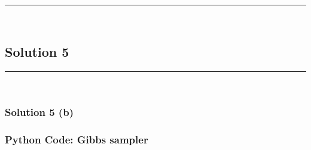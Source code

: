 \documentclass{article}
\begin{document}
\noindent\rule{\textwidth}{0.4pt}\\

\newpage

\subsection*{Solution 5}
\noindent\rule{\textwidth}{0.4pt}\\
\subsubsection*{Solution 5 (b)}
\subsubsection*{Python Code: Gibbs sampler}
\end{document}
